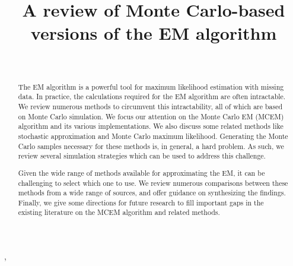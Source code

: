 \documentclass[ss]{imsart}
\theoremstyle{plain}
\theoremstyle{definition}
\theoremstyle{remark}
\begin{document}
\begin{frontmatter}
\title{A review of Monte Carlo-based versions of the EM algorithm}

\begin{aug}
\author[A]{~},
\address[A]{Department of Statistics and Actuarial Science,
Simon Fraser University}

\end{aug}

\begin{abstract}
    The EM algorithm is a powerful tool for maximum likelihood estimation with missing data. In practice, the calculations required for the EM algorithm are often intractable. We review numerous methods to circumvent this intractability, all of which are based on Monte Carlo simulation. We focus our attention on the Monte Carlo EM (MCEM) algorithm and its various implementations. We also discuss some related methods like stochastic approximation and Monte Carlo maximum likelihood. Generating the Monte Carlo samples necessary for these methods is, in general, a hard problem. As such, we review several simulation strategies which can be used to address this challenge.

    Given the wide range of methods available for approximating the EM, it can be challenging to select which one to use. We review numerous comparisons between these methods from a wide range of sources, and offer guidance on synthesizing the findings. Finally, we give some directions for future research to fill important gaps in the existing literature on the MCEM algorithm and related methods.
\end{abstract}

\begin{keyword}[class=MSC]
\end{keyword}

\begin{keyword}
\end{keyword}

\end{frontmatter}
\end{document}
